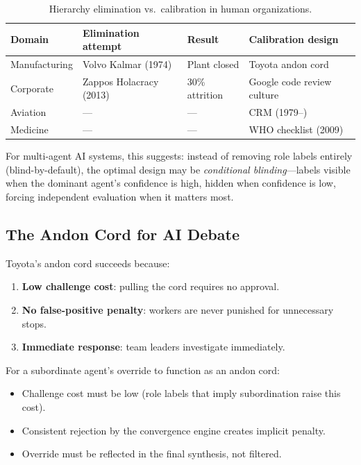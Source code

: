 \documentclass[11pt]{article}
\theoremstyle{definition}
\begin{document}
\begin{table}[h]
\centering
\small
\begin{tabular}{@{}llll@{}}
\toprule
\textbf{Domain} & \textbf{Elimination attempt} & \textbf{Result} & \textbf{Calibration design} \\
\midrule
Manufacturing & Volvo Kalmar (1974) & Plant closed & Toyota andon cord \\
Corporate     & Zappos Holacracy (2013) & 30\% attrition & Google code review culture \\
Aviation      & ---                     & ---            & CRM (1979--) \\
Medicine      & ---                     & ---            & WHO checklist (2009) \\
\bottomrule
\end{tabular}
\caption{Hierarchy elimination vs.\ calibration in human organizations.}
\label{tab:elimination_vs_calibration}
\end{table}

For multi-agent AI systems, this suggests: instead of removing role labels entirely (blind-by-default), the optimal design may be \emph{conditional blinding}---labels visible when the dominant agent's confidence is high, hidden when confidence is low, forcing independent evaluation when it matters most.

\subsection{The Andon Cord for AI Debate}

Toyota's andon cord succeeds because:
\begin{enumerate}[nosep]
    \item \textbf{Low challenge cost}: pulling the cord requires no approval.
    \item \textbf{No false-positive penalty}: workers are never punished for unnecessary stops.
    \item \textbf{Immediate response}: team leaders investigate immediately.
\end{enumerate}

For a subordinate agent's override to function as an andon cord:
\begin{itemize}[nosep]
    \item Challenge cost must be low (role labels that imply subordination raise this cost).
    \item Consistent rejection by the convergence engine creates implicit penalty.
    \item Override must be reflected in the final synthesis, not filtered.
\end{itemize}
\end{document}
